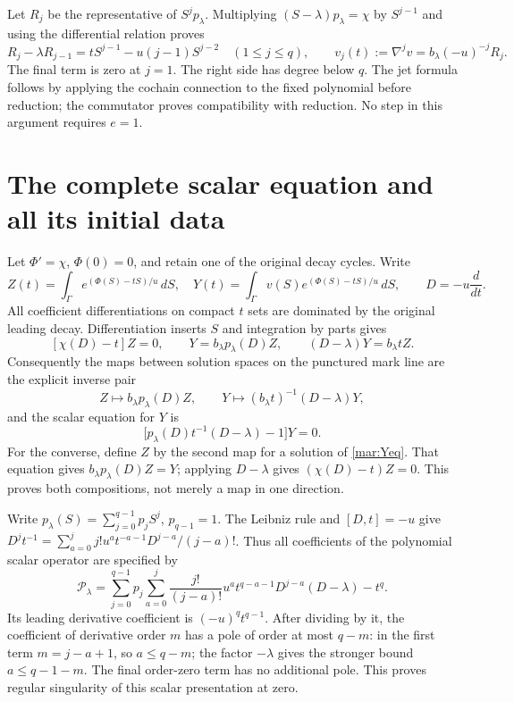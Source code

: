 \documentclass[11pt]{article}
\begin{document}
Let $R_j$ be the representative of $S^jp_\lambda$. Multiplying
$(S-\lambda)p_\lambda=\chi$ by $S^{j-1}$ and using the differential
relation proves
\begin{equation}\tag{MAR3}\label{mar:rec}
 R_j-\lambda R_{j-1}=tS^{j-1}-u(j-1)S^{j-2}\quad(1\le j\le q),
 \qquad v_j(t):=\nabla^jv=b_\lambda(-u)^{-j}R_j.
\end{equation}
The final term is zero at $j=1$. The right side has degree below $q$.
The jet formula follows by applying the cochain connection to the fixed
polynomial before reduction; the commutator proves compatibility with
reduction. No step in this argument requires $e=1$.

\section{The complete scalar equation and all its initial data}
Let $\Phi'=\chi$, $\Phi(0)=0$, and retain one of the original decay
cycles. Write
\[
 Z(t)=\int_\Gamma e^{(\Phi(S)-tS)/u}\,dS,\quad
 Y(t)=\int_\Gamma v(S)e^{(\Phi(S)-tS)/u}\,dS,
 \qquad D=-u\frac{d}{dt}.
\]
All coefficient differentiations on compact $t$ sets are dominated by
the original leading decay. Differentiation inserts $S$ and integration
by parts gives
\begin{equation}\tag{MAR4}\label{mar:scalar-maps}
 [\chi(D)-t]Z=0,\qquad
 Y=b_\lambda p_\lambda(D)Z,\qquad
 (D-\lambda)Y=b_\lambda t Z.
\end{equation}
Consequently the maps between solution spaces on the punctured mark line
are the explicit inverse pair
\begin{equation}\tag{MAR5}\label{mar:inverse-solutions}
 Z\longmapsto b_\lambda p_\lambda(D)Z,
 \qquad Y\longmapsto (b_\lambda t)^{-1}(D-\lambda)Y,
\end{equation}
and the scalar equation for $Y$ is
\begin{equation}\tag{MAR6}\label{mar:Yeq}
 \bigl[p_\lambda(D)t^{-1}(D-\lambda)-1\bigr]Y=0.
\end{equation}
For the converse, define $Z$ by the second map for a solution of
\eqref{mar:Yeq}. That equation gives $b_\lambda p_\lambda(D)Z=Y$;
applying $D-\lambda$ gives $(\chi(D)-t)Z=0$. This proves both
compositions, not merely a map in one direction.

Write $p_\lambda(S)=\sum_{j=0}^{q-1}p_jS^j$, $p_{q-1}=1$.
The Leibniz rule and $[D,t]=-u$ give
$D^jt^{-1}=\sum_{a=0}^j j!u^a t^{-a-1}D^{j-a}/(j-a)!$.
Thus all coefficients of the polynomial scalar operator are specified by
\begin{equation}\tag{MAR7}\label{mar:P}
 \mathscr P_\lambda=
 \sum_{j=0}^{q-1}p_j\sum_{a=0}^j
 \frac{j!}{(j-a)!}u^a t^{q-a-1}D^{j-a}(D-\lambda)-t^q.
\end{equation}
Its leading derivative coefficient is $(-u)^q t^{q-1}$.
After dividing by it, the coefficient of derivative order $m$ has
a pole of order at most $q-m$: in the first term $m=j-a+1$,
so $a\le q-m$; the factor $-\lambda$ gives the stronger bound
$a\le q-1-m$. The final order-zero term has no additional pole.
This proves regular singularity of this scalar presentation at zero.
\end{document}
